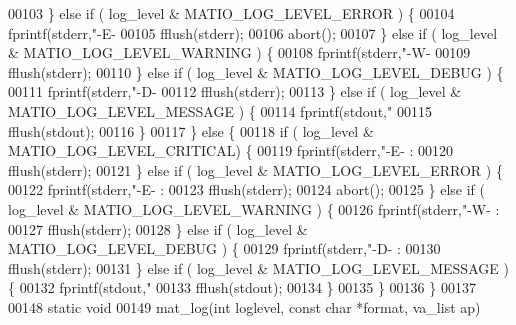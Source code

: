 \begin{DoxyCode}
{00103         \} \textcolor{keywordflow}{else} \textcolor{keywordflow}{if} ( log\_level & MATIO\_LOG\_LEVEL\_ERROR ) \{
00104             fprintf(stderr,\textcolor{stringliteral}{"-E- %
00105             fflush(stderr);
00106             abort();
00107         \} \textcolor{keywordflow}{else} \textcolor{keywordflow}{if} ( log\_level & MATIO\_LOG\_LEVEL\_WARNING ) \{
00108             fprintf(stderr,\textcolor{stringliteral}{"-W- %
00109             fflush(stderr);
00110         \} \textcolor{keywordflow}{else} \textcolor{keywordflow}{if} ( log\_level & MATIO\_LOG\_LEVEL\_DEBUG ) \{
00111             fprintf(stderr,\textcolor{stringliteral}{"-D- %
00112             fflush(stderr);
00113         \} \textcolor{keywordflow}{else} \textcolor{keywordflow}{if} ( log\_level & MATIO\_LOG\_LEVEL\_MESSAGE ) \{
00114             fprintf(stdout,\textcolor{stringliteral}{"%
00115             fflush(stdout);
00116         \}
00117     \} \textcolor{keywordflow}{else} \{
00118         \textcolor{keywordflow}{if} ( log\_level & MATIO\_LOG\_LEVEL\_CRITICAL) \{
00119             fprintf(stderr,\textcolor{stringliteral}{"-E- : %
00120             fflush(stderr);
00121         \} \textcolor{keywordflow}{else} \textcolor{keywordflow}{if} ( log\_level & MATIO\_LOG\_LEVEL\_ERROR ) \{
00122             fprintf(stderr,\textcolor{stringliteral}{"-E- : %
00123             fflush(stderr);
00124             abort();
00125         \} \textcolor{keywordflow}{else} \textcolor{keywordflow}{if} ( log\_level & MATIO\_LOG\_LEVEL\_WARNING ) \{
00126             fprintf(stderr,\textcolor{stringliteral}{"-W- : %
00127             fflush(stderr);
00128         \} \textcolor{keywordflow}{else} \textcolor{keywordflow}{if} ( log\_level & MATIO\_LOG\_LEVEL\_DEBUG ) \{
00129             fprintf(stderr,\textcolor{stringliteral}{"-D- : %
00130             fflush(stderr);
00131         \} \textcolor{keywordflow}{else} \textcolor{keywordflow}{if} ( log\_level & MATIO\_LOG\_LEVEL\_MESSAGE ) \{
00132             fprintf(stdout,\textcolor{stringliteral}{"%
00133             fflush(stdout);
00134         \}
00135     \}
00136 \}
00137 
00148 \textcolor{keyword}{static} \textcolor{keywordtype}{void}
00149 mat\_log(\textcolor{keywordtype}{int} loglevel, \textcolor{keyword}{const} \textcolor{keywordtype}{char} *format, va\_list ap)
}}}}}}}}}}
\end{DoxyCode}
